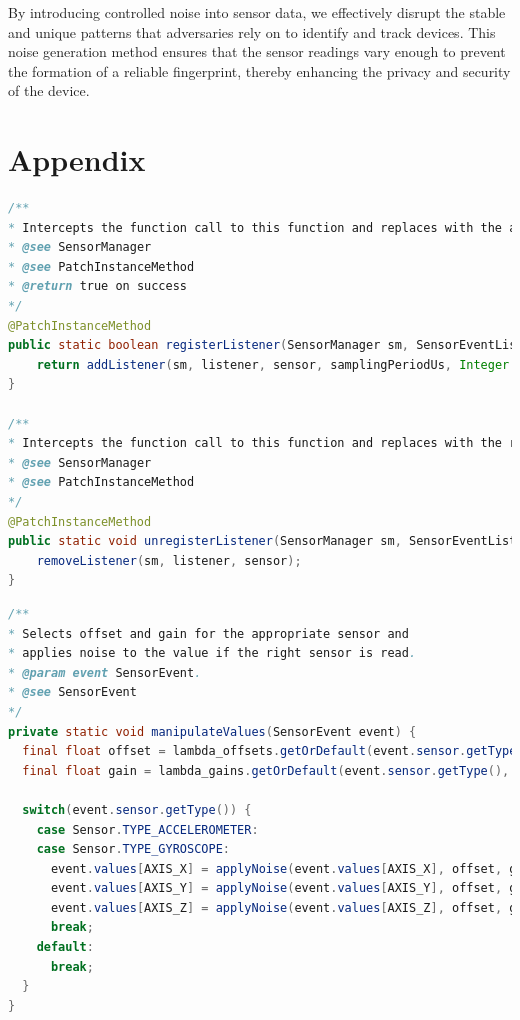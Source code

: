 \documentclass[11pt,
  oneside,openany,    %
]{scrreprt}
\begin{document}
By introducing controlled noise into sensor data, we effectively disrupt the stable and unique patterns that adversaries rely on to identify and track devices. 
This noise generation method ensures that the sensor readings vary enough to prevent the formation of a reliable fingerprint, thereby enhancing the privacy and security of the device.



\printbibliography[heading=bibintoc]

\appendix

\chapter{Appendix}
\label{chap:appendix}


\begin{lstlisting}[language=java, caption=Intercept Methods, label=lst:intercept_method]
/**
* Intercepts the function call to this function and replaces with the addListener.
* @see SensorManager
* @see PatchInstanceMethod
* @return true on success
*/
@PatchInstanceMethod
public static boolean registerListener(SensorManager sm, SensorEventListener listener, Sensor sensor, int samplingPeriodUs) {
    return addListener(sm, listener, sensor, samplingPeriodUs, Integer.MIN_VALUE, null);
}

/**
* Intercepts the function call to this function and replaces with the removeListener.
* @see SensorManager
* @see PatchInstanceMethod
*/
@PatchInstanceMethod
public static void unregisterListener(SensorManager sm, SensorEventListener listener, Sensor sensor) {
    removeListener(sm, listener, sensor);
}
\end{lstlisting}
\pagebreak
\begin{lstlisting}[language=java, caption=Noise Generating Function, label=lst:noise_gen_func]
/**
* Selects offset and gain for the appropriate sensor and
* applies noise to the value if the right sensor is read.
* @param event SensorEvent.
* @see SensorEvent
*/
private static void manipulateValues(SensorEvent event) {
  final float offset = lambda_offsets.getOrDefault(event.sensor.getType(), 0.0f);
  final float gain = lambda_gains.getOrDefault(event.sensor.getType(), 0.0f);

  switch(event.sensor.getType()) {
    case Sensor.TYPE_ACCELEROMETER:
    case Sensor.TYPE_GYROSCOPE:
      event.values[AXIS_X] = applyNoise(event.values[AXIS_X], offset, gain);
      event.values[AXIS_Y] = applyNoise(event.values[AXIS_Y], offset, gain);
      event.values[AXIS_Z] = applyNoise(event.values[AXIS_Z], offset, gain);
      break;
    default:
      break;
  }
}
\end{lstlisting}
\end{document}
